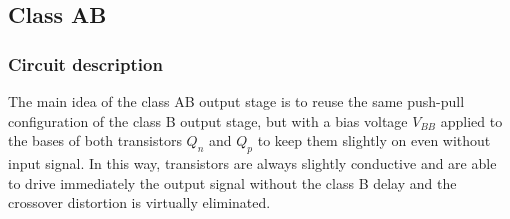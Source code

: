\newpage

\subsection{Class AB}
\subsubsection*{Circuit description}
The main idea of the class AB output stage is to reuse the same push-pull configuration of the class B output stage, but with
a bias voltage \(V_{BB}\) applied to the bases of both transistors \(Q_n\) and \(Q_p\) to keep them slightly on even without
input signal. In this way, transistors are always slightly conductive and are able to drive immediately the output signal
without the class B delay and the crossover distortion is virtually eliminated.

